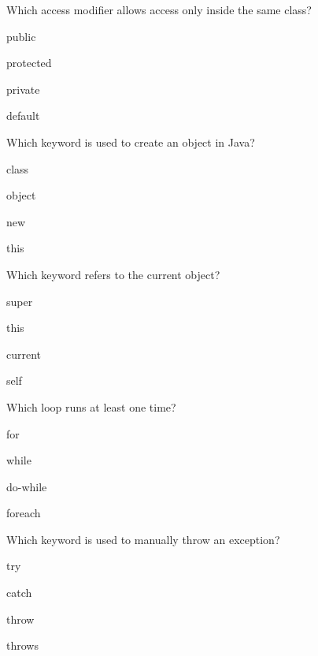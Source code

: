 \documentclass{CWNUExam}
\begin{document}
\begin{question}
Which access modifier allows access only inside the same class?
\paren
\begin{choices}
\item public
\item protected
\item private
\item default
\end{choices}
\end{question}

\begin{question}
Which keyword is used to create an object in Java?
\paren
\begin{choices}
\item class
\item object
\item new
\item this
\end{choices}
\end{question}

\begin{question}
Which keyword refers to the current object?
\paren
\begin{choices}
\item super
\item this
\item current
\item self
\end{choices}
\end{question}

\begin{question}
Which loop runs at least one time?
\paren
\begin{choices}
\item for
\item while
\item do-while
\item foreach
\end{choices}
\end{question}

\begin{question}
Which keyword is used to manually throw an exception?
\paren
\begin{choices}
\item try
\item catch
\item throw
\item throws
\end{choices}
\end{question}
\end{document}
